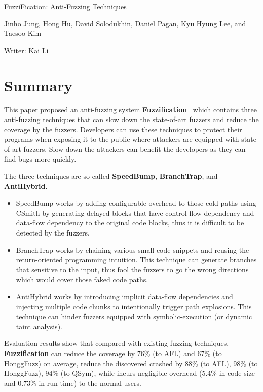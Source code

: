 \documentclass[letterpaper,11pt]{article}
\begin{document}
\begin{center}
{\Large FuzziFication: Anti-Fuzzing Techniques} 

{Jinho Jung, Hong Hu, David Solodukhin, Daniel Pagan, Kyu Hyung Lee, and Taesoo Kim}
\bigskip

{\large Writer: Kai Li}
\date{\today}
\end{center}


\section{Summary}
This paper proposed an anti-fuzzing system \textbf{Fuzzification}~\cite{reading1} which contains three anti-fuzzing techniques that can slow down the state-of-art fuzzers and reduce the coverage by the fuzzers. Developers can use these techniques to protect their programs when exposing it to the public where attackers are equipped with state-of-art fuzzers. Slow down the attackers can benefit the developers as they can find bugs more quickly. 

The three techniques are so-called \textbf{SpeedBump}, \textbf{BranchTrap}, and \textbf{AntiHybrid}. 
\begin{itemize}
\item SpeedBump works by adding configurable overhead to those cold paths using CSmith by generating delayed blocks that have control-flow dependency and data-flow dependency to the original code blocks, thus it is difficult to be detected by the fuzzers.    
\item BranchTrap works by chaining various small code snippets and reusing the return-oriented programming intuition. This technique can generate branches that sensitive to the input, thus fool the fuzzers to go the wrong directions which would cover those faked code paths.
\item AntiHybrid works by introducing implicit data-flow dependencies and injecting multiple code chunks to intentionally trigger path explosions. This technique can hinder fuzzers equipped with symbolic-execution (or dynamic taint analysis). 
\end{itemize}

Evaluation results show that compared with existing fuzzing techniques, \textbf{Fuzzification} can reduce the coverage by 76\% (to AFL) and 67\% (to HonggFuzz) on average, reduce the discovered crashed by 88\% (to AFL), 98\% (to HonggFuzz), 94\% (to QSym), while incurs negligible overhead (5.4\% in code size and 0.73\% in run time) to the normal users.     
\end{document}

